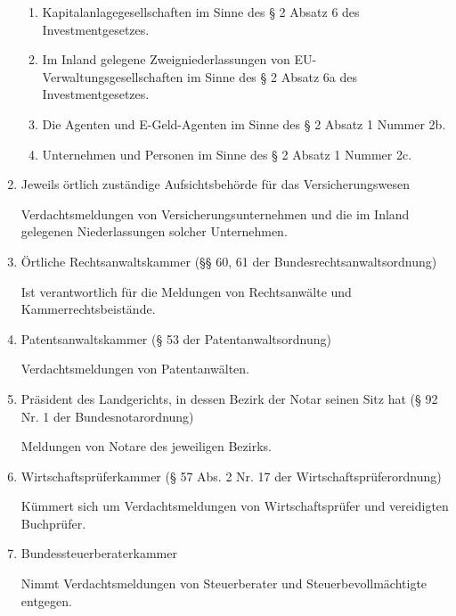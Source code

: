 \documentclass{article}
\begin{document}
\begin{enumerate}
\begin{enumerate}
                        \item

                            Kapitalanlagegesellschaften im Sinne des § 2 Absatz 6 des
                            Investmentgesetzes.

                        \item

                            Im Inland gelegene Zweigniederlassungen von EU-
                            Verwaltungsgesellschaften im Sinne des § 2 Absatz 6a des
                            Investmentgesetzes.

                        \item

                            Die Agenten und E-Geld-Agenten im Sinne des § 2 Absatz 1 Nummer 2b.

                        \item

                            Unternehmen und Personen im Sinne des § 2 Absatz 1 Nummer 2c.

                    \end{enumerate}

                \item Jeweils örtlich zuständige Aufsichtsbehörde für das Versicherungswesen

                    Verdachtsmeldungen von Versicherungsunternehmen und die im Inland gelegenen Niederlassungen solcher Unternehmen.

                \item Örtliche Rechtsanwaltskammer (§§ 60, 61 der Bundesrechtsanwaltsordnung)

                    Ist verantwortlich für die Meldungen von Rechtsanwälte und Kammerrechtsbeistände.

                \item  Patentsanwaltskammer (§ 53 der Patentanwaltsordnung)
                    
                    Verdachtsmeldungen von Patentanwälten.

                \item Präsident des Landgerichts, in dessen Bezirk der Notar seinen Sitz hat (§ 92 Nr. 1 der Bundesnotarordnung)

                    Meldungen von Notare des jeweiligen Bezirks.

                \item Wirtschaftsprüferkammer (§ 57 Abs. 2 Nr. 17 der Wirtschaftsprüferordnung)
                
                    Kümmert sich um Verdachtsmeldungen von Wirtschaftsprüfer und vereidigten Buchprüfer.

                \item Bundessteuerberaterkammer

                    Nimmt Verdachtsmeldungen von Steuerberater und Steuerbevollmächtigte entgegen.

            \end{enumerate}
\end{document}
